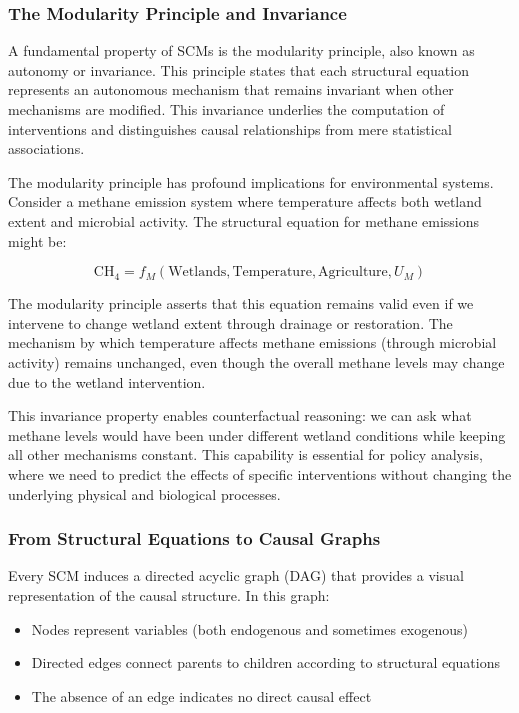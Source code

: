 \subsubsection{The Modularity Principle and Invariance}

A fundamental property of SCMs is the modularity principle, also known as autonomy or invariance. This principle states that each structural equation represents an autonomous mechanism that remains invariant when other mechanisms are modified. This invariance underlies the computation of interventions and distinguishes causal relationships from mere statistical associations.

The modularity principle has profound implications for environmental systems. Consider a methane emission system where temperature affects both wetland extent and microbial activity. The structural equation for methane emissions might be:

\begin{equation}
	\text{CH}_4 = f_M(\text{Wetlands}, \text{Temperature}, \text{Agriculture}, U_M)
\end{equation}

The modularity principle asserts that this equation remains valid even if we intervene to change wetland extent through drainage or restoration. The mechanism by which temperature affects methane emissions (through microbial activity) remains unchanged, even though the overall methane levels may change due to the wetland intervention.

This invariance property enables counterfactual reasoning: we can ask what methane levels would have been under different wetland conditions while keeping all other mechanisms constant. This capability is essential for policy analysis, where we need to predict the effects of specific interventions without changing the underlying physical and biological processes.

\subsubsection{From Structural Equations to Causal Graphs}

Every SCM induces a directed acyclic graph (DAG) that provides a visual representation of the causal structure. In this graph:

\begin{itemize}
	\item Nodes represent variables (both endogenous and sometimes exogenous)
	\item Directed edges connect parents to children according to structural equations
	\item The absence of an edge indicates no direct causal effect
\end{itemize}

